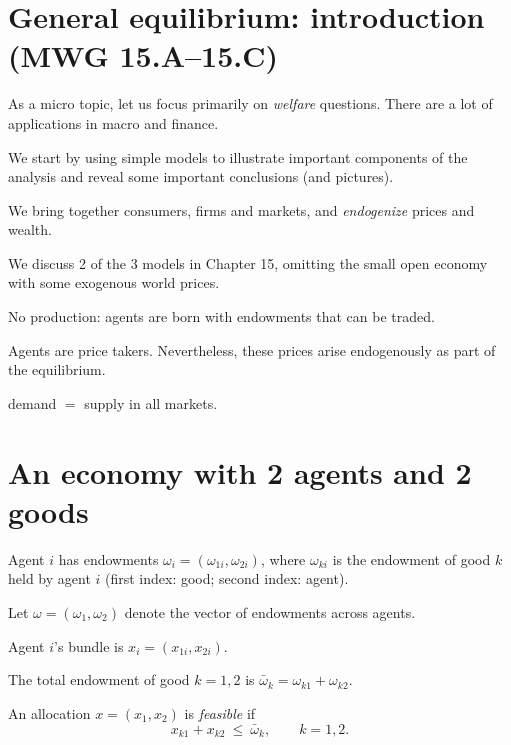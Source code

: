 \documentclass[11pt]{article}
\begin{document}
\section{General equilibrium: introduction (MWG 15.A--15.C)}

As a micro topic, let us focus primarily on \emph{welfare} questions. There are a lot of
applications in macro and finance.

\begin{flatlist}
  \item We start by using simple models to illustrate important components of the
        analysis and reveal some important conclusions (and pictures).
  \item We bring together consumers, firms and markets, and \emph{endogenize} prices
        and wealth.
  \item We discuss 2 of the 3 models in Chapter 15, omitting the small open economy
        with some exogenous world prices.
\end{flatlist}

No production: agents are born with endowments that can be traded.

 Agents are price takers. Nevertheless, these prices arise
endogenously as part of the equilibrium.

 demand $=$ supply in all markets.


\section{An economy with 2 agents and 2 goods}

\begin{flatlist}
  \item Agent $i$ has endowments $\omega_i=(\omega_{1i},\omega_{2i})$, where
        $\omega_{ki}$ is the endowment of good $k$ held by agent $i$ (first index:
        good; second index: agent).
  \item Let $\omega=(\omega_1,\omega_2)$ denote the vector of endowments across agents.
  \item Agent $i$'s bundle is $x_i=(x_{1i},x_{2i})$.
  \item The total endowment of good $k=1,2$ is $\bar\omega_k=\omega_{k1}+\omega_{k2}$.
  \item An allocation $x=(x_1,x_2)$ is \emph{feasible} if
        \[ x_{k1}+x_{k2}\ \le\ \bar\omega_k, \qquad k=1,2. \]
\end{flatlist}
\end{document}
